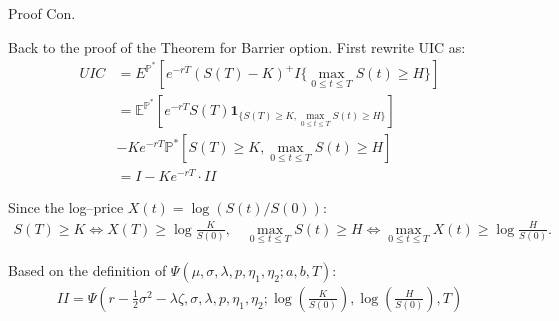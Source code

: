 \documentclass{beamer}
\begin{document}
\begin{frame}{Proof Con.}

    
    {\footnotesize \footnotesize
    \par Back to the proof of the Theorem for Barrier option. First rewrite UIC as:
    {\footnotesize \tiny
    \begin{align*}
        UIC & = E^{\mathbb{P}^*}[e^{-rT}(S(T) - K)^+I{\{ \max\limits_{0 \leq t \leq T} S(t) \geq H \}}]\\
        &= \mathbb{E}^{\mathbb{P}^*} \left[ e^{-rT} S(T) \mathbf{1}_{\{S(T) \geq K, \max_{0 \leq t \leq T} S(t) \geq H\}} \right]\\
        &- Ke^{-rT} \mathbb{P}^* \left[ S(T) \geq K, \max_{0 \leq t \leq T} S(t) \geq H \right]\\
        &= I - Ke^{-rT} \cdot II 
    \end{align*}
    }
    \par Since the log–price \( X(t) = \log(S(t)/S(0)) \):
    {\footnotesize \tiny
    \begin{align*}
        S(T) \geq K \iff X(T) \geq \log \frac{K}{S(0)},
        \quad \max_{0 \leq t \leq T} S(t) \geq H \iff \max_{0 \leq t \leq T} X(t) \geq \log \frac{H}{S(0)}.
    \end{align*}
    }
    \par Based on the definition of $\Psi(\mu, \sigma, \lambda, p, \eta_1, \eta_2; a, b, T)$:
    {\footnotesize \tiny
    \begin{align*}
        II = \Psi \left( r - \frac{1}{2} \sigma^2 - \lambda \zeta, \sigma, \lambda, p, \eta_1, \eta_2; \log \left( \frac{K}{S(0)} \right), \log \left( \frac{H}{S(0)} \right), T \right)
    \end{align*}
    }
    }
    
\end{frame}
\end{document}
